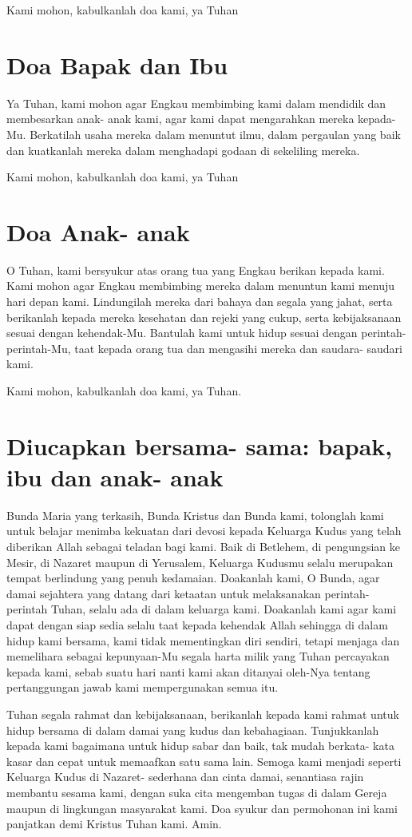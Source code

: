 \documentclass[a5paper,headsepline,titlepage,11pt,nnormalheadings,DIVcalc]{scrbook}
\begin{document}
Kami mohon, kabulkanlah doa kami, ya Tuhan

\section*{Doa Bapak dan Ibu}
Ya Tuhan, kami mohon agar Engkau membimbing kami dalam mendidik dan membesarkan anak- anak kami, agar kami dapat mengarahkan mereka kepada-Mu. Berkatilah usaha mereka dalam menuntut ilmu, dalam pergaulan yang baik dan kuatkanlah mereka dalam menghadapi godaan di sekeliling mereka.

Kami mohon, kabulkanlah doa kami, ya Tuhan

\section*{Doa Anak- anak}
O Tuhan, kami bersyukur atas orang tua yang Engkau berikan kepada kami. Kami mohon agar Engkau membimbing mereka dalam menuntun kami menuju hari depan kami. Lindungilah mereka dari bahaya dan segala yang jahat, serta berikanlah kepada mereka kesehatan dan rejeki yang cukup, serta kebijaksanaan sesuai dengan kehendak-Mu. Bantulah kami untuk hidup sesuai dengan perintah- perintah-Mu, taat kepada orang tua dan mengasihi mereka dan saudara- saudari kami.

Kami mohon, kabulkanlah doa kami, ya Tuhan.

\section*{Diucapkan bersama- sama: bapak, ibu dan anak- anak}
Bunda Maria yang terkasih, Bunda Kristus dan Bunda kami, tolonglah kami untuk belajar menimba kekuatan dari devosi kepada Keluarga Kudus yang telah diberikan Allah sebagai teladan bagi kami. Baik di Betlehem, di pengungsian ke Mesir, di Nazaret maupun di Yerusalem, Keluarga Kudusmu selalu merupakan tempat berlindung yang penuh kedamaian. Doakanlah kami, O Bunda, agar damai sejahtera yang datang dari ketaatan untuk melaksanakan perintah- perintah Tuhan, selalu ada di dalam keluarga kami. Doakanlah kami agar kami dapat dengan siap sedia selalu taat kepada kehendak Allah sehingga di dalam hidup kami bersama, kami tidak mementingkan diri sendiri, tetapi menjaga dan memelihara sebagai kepunyaan-Mu segala harta milik yang Tuhan percayakan kepada kami, sebab suatu hari nanti kami akan ditanyai oleh-Nya tentang pertanggungan jawab kami mempergunakan semua itu.

Tuhan segala rahmat dan kebijaksanaan, berikanlah kepada kami rahmat untuk hidup bersama di dalam damai yang kudus dan kebahagiaan. Tunjukkanlah kepada kami bagaimana untuk hidup sabar dan baik, tak mudah berkata- kata kasar dan cepat untuk memaafkan satu sama lain. Semoga kami menjadi seperti Keluarga Kudus di Nazaret- sederhana dan cinta damai, senantiasa rajin membantu sesama kami, dengan suka cita mengemban tugas di dalam Gereja maupun di lingkungan masyarakat kami.
Doa syukur dan permohonan ini kami panjatkan demi Kristus Tuhan kami. Amin.
\end{document}
